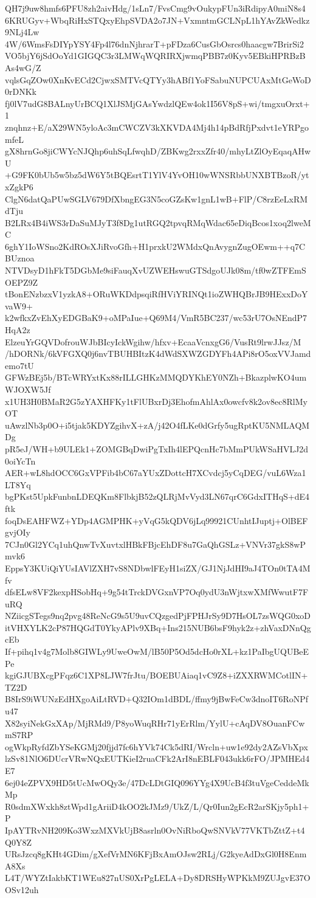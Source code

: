 QH7j9uw8hmfs6PFU8zh2aivHdg/1sLn7/FvsCmg9vOukypFUn3iRdipyA0miN8s4
6KRUGyv+WbqRiHxSTQxyEhpSVDA2o7JN+VxmntmGCLNpL1hYAvZkWedkz9NLj4Lw
4W/6WmsFsDIYpYSY4Fp4l76dnNjhrarT+pFDza6CusGbOsrcs0haacgw7BrirSi2
VO5bjY6jSdOoYd1GIGQC3r3LMWqWQRIRXjwmqPBB7z0Kyv5EBkiHPRBzBAs4wG/Z
vqlsGqZOw0XnKvECd2CjwxSMTVcQTYy3hABf1YoFSabuNUPCUAxMtGeWoD0rDNKk
fj0lV7udG8BALnyUrBCQ1XlJSMjGAsYwdzlQEw4ok1I56V8pS+wi/tmgxuOrxt+1
znqhnz+E/aX29WN5yloAc3mCWCZV3kXKVDA4Mj4h14pBdRfjPxdvt1eYRPgomfeL
gX8hrnGo8jiCWYcNJQhp6uhSqLfwqhD/ZBKwg2rxxZfr40/mhyLtZlOyEqaqAHwU
+G9FK0bUb5w5bz5dW6Y5tBQEsrtT1YlV4YvOH10wWNSRbbUNXBTBzoR/ytxZgkP6
ClgN6datQaPUwSGLV679DfXbngEG3N5coGZsKw1gnL1wB+FlP/C8rzEeLxRMdTju
B2LRx4B4iWS3rDaSuMJyT3f8Dg1utRGQ2tpvqRMqWdac65eDiqBcos1xoq2lweMC
6ghY1IoWSno2KdROsXJiRvoGfh+H1prxkU2WMdxQnAvygnZugOEwm++q7CBUznoa
NTVDsyD1hFkT5DGbMe9siFauqXvUZWEHswuGTSdgoUJk08m/tf0wZTFEmSOEPZ9Z
tBonENzbzxV1yzkA8+ORuWKDdpsqiRfHViYRINQt1ioZWHQBrJB9HExxDoYvaW9+
k2wfkxZvEhXyEDGBaK9+oMPaIue+Q69M4/VmR5BC237/wc53rU7OsNEndP7HqA2z
ElzeuYrGQVDofrouWJbBIcyIckWgihw/hfxv+EcaaVcnxgG6/VusRt9lrwJJsz/M
/hDORNk/6kVFGXQ0j6nvTBUHBItzK4dWdSXWZGDYFh4APi8rO5oxVVJamdemo7tU
GFWzBEj5b/BTcWRYxtKx88rILLGHKzMMQDYKhEY0NZh+BkazplwKO4umWJOXW5Jf
x1UH3H0BMaR2G5zYAXHFKy1tFlUBxrDj3EhofmAhlAx0owcfv8k2ov8ec8RlMyOT
uAwzlNb3p0O+i5tjak5KDYZgihvX+zA/j42O4fLKe0dGrfy5ugRptKU5NMLAQMDg
pR5eJ/WH+b9ULEk1+ZOMGBqDwiPgTxIh4lEPQcnHc7bMmPUkWSaHVLJ2d0oiYcTn
AER+wL8hdOCC6GxVPFib4bC67aYUxZDottcH7XCvdcj5yCqDEG/vuL6Wza1LT8Yq
bgPKst5UpkFunbnLDEQKm8FlbkjB52zQLRjMvVyd3LN67qrC6GdxITHqS+dE4ftk
foqDsEAHFWZ+YDp4AGMPHK+yVqG5kQDV6jLq99921CUnhtIJuptj+OlBEFgvjOIy
7CJn0Gl2YCq1uhQnwTvXuvtxlHBkFBjcEhDF8u7GaQhGSLz+VNVr37gkS8wPmvk6
EppsY3KUiQiYUsIAVlZXH7vS8NDbwlFEyH1siZX/GJ1NjJdHI9aJ4TOn0tTA4Mfv
dfsELw8VF2kexpHSobHq+9g54tTrckDVGxnVP7Oq0ydU3nWjtxwXMfWwutF7FuRQ
NZiicgSTegs9nq2pvg48ReNcG9s5U9uvCQzgedPjFPHJrSy9D7HsOL7zsWQG0xoD
itVHXYLK2cP87HQGdT0YkyAPlv9XBq+Ins215NUB6bsF9hyk2z+zhVaxDNnQgcEb
If+pihq1v4g7Molb8GIWLy9UweOwM/lB50P5Od5dcHo0rXL+kz1PaIbgUQUBeEPe
kgiGJUBXcgPFqz6C1XP8LJW7frJtu/BOEBUAiaq1vC9Z8+iZXXRWMCotlIN+TZ2D
B8IrS9iWUNzEdHXgoAiLtRVD+Q32IOm1dBDL/ffmy9jBwFeCw3dnoIT6RoNPfu47
X82syiNekGxXAp/MjRMd9/P8yoWuqRHr71yErRlm/YylU+cAqDV8OuanFCwmS7RP
ogWkpRyfdZbYSeKGMj20fjjd7fc6hYVk74Ck5dRI/Wrcln+uw1e92dy2AZsVbXpx
lzSv81NlO6DUcrVRwNQxEUTKieI2ruaCFk2ArI8nEBLF043ukk6rFO/JPMHEd4E7
6ej04eZPVX9HD5tUcMwOQy3e/47DcLDtGIQ096YYg4X9UcB4f3tuVgeCeddeMkMp
R0sdmXWxkh8ztWpd1gAriiD4kOO2kJMz9/UkZ/L/Qr0Iun2gEcR2arSKjy5ph1+P
IpAYTRvNH209Ko3WxzMXVkUjB8asrln0OvNiRboQwSNVkV77VKTbZttZ+t4Q0Y8Z
URsJzcq8gKHt4GDim/gXefVrMN6KFjBxAmOJsw2RLj/G2kyeAdDxGl0H8EnmA8Xs
L4T/WYZtIakbKT1WEu827nUS0XrPgLELA+Dy8DRSHyWPKkM9ZUJgvE37OOSv12uh
